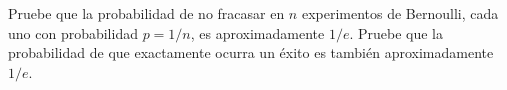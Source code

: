 \begin{statement}{21}
  Pruebe que la probabilidad de no fracasar en $n$ experimentos de Bernoulli, cada uno con probabilidad
  $p = 1 / n$, es aproximadamente $1 / e$. Pruebe que la probabilidad de que exactamente ocurra un
  \'exito es tambi\'en aproximadamente $1 / e$.
\end{statement}